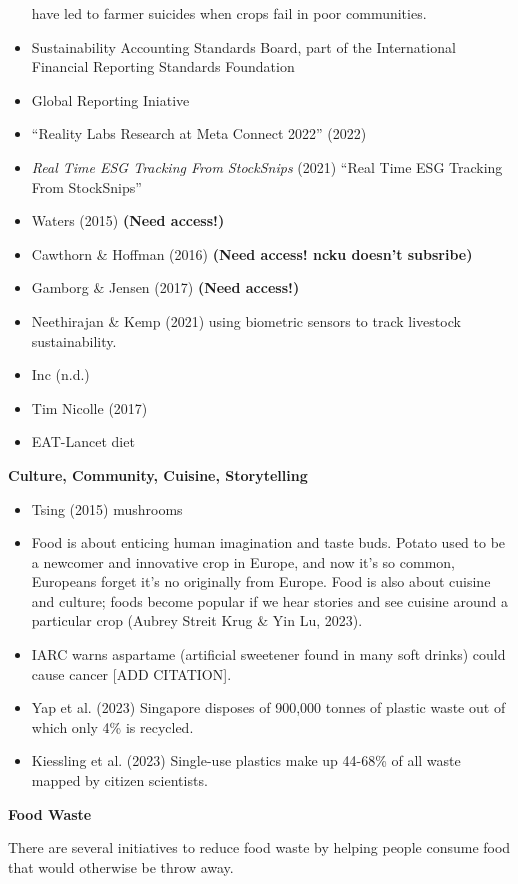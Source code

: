 \documentclass[
  letterpaper,
  DIV=11,
  numbers=noendperiod]{scrartcl}
\providecommand{\tightlist}{%
  \setlength{\itemsep}{0pt}\setlength{\parskip}{0pt}}\usepackage{longtable,booktabs,array}
\begin{document}
\begin{itemize}
  have led to farmer suicides when crops fail in poor communities.
\item
  Sustainability Accounting Standards Board, part of the International
  Financial Reporting Standards Foundation
\item
  Global Reporting Iniative
\item
  {``Reality {Labs Research} at {Meta Connect} 2022''} (2022)
\item
  \emph{Real {Time ESG Tracking From StockSnips}} (2021) ``Real Time ESG
  Tracking From StockSnips''
\item
  Waters (2015) \textbf{(Need access!)}
\item
  Cawthorn \& Hoffman (2016) \textbf{(Need access! ncku doesn't
  subsribe)}
\item
  Gamborg \& Jensen (2017) \textbf{(Need access!)}
\item
  Neethirajan \& Kemp (2021) using biometric sensors to track livestock
  sustainability.
\item
  Inc (n.d.)
\item
  Tim Nicolle (2017)
\item
  EAT-Lancet diet
\end{itemize}

\textbf{Culture, Community, Cuisine, Storytelling}

\begin{itemize}
\tightlist
\item
  Tsing (2015) mushrooms
\item
  Food is about enticing human imagination and taste buds. Potato used
  to be a newcomer and innovative crop in Europe, and now it's so
  common, Europeans forget it's no originally from Europe. Food is also
  about cuisine and culture; foods become popular if we hear stories and
  see cuisine around a particular crop (Aubrey Streit Krug \& Yin Lu,
  2023).
\item
  IARC warns aspartame (artificial sweetener found in many soft drinks)
  could cause cancer {[}ADD CITATION{]}.
\item
  Yap et al. (2023) Singapore disposes of 900,000 tonnes of plastic
  waste out of which only 4\% is recycled.
\item
  Kiessling et al. (2023) Single-use plastics make up 44-68\% of all
  waste mapped by citizen scientists.
\end{itemize}

\textbf{Food Waste}

There are several initiatives to reduce food waste by helping people
consume food that would otherwise be throw away.
\end{document}
